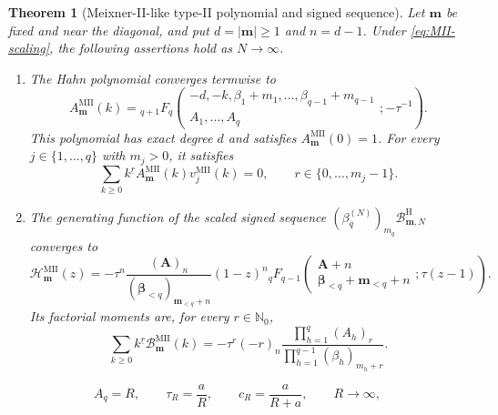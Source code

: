 \documentclass[10pt,a4paper]{amsart}
\newtheorem{theorem}{Theorem}
\newcommand{\A}{\boldsymbol A}
\newcommand{\Nzero}{\mathbb N_0}
\newcommand{\abs}[1]{\lvert#1\rvert}
\newcommand{\bbeta}{\boldsymbol\beta}
\newcommand{\fall}[2]{#1^{\underline{#2}}}
\newcommand{\mm}{\boldsymbol m}
\newcommand{\pFq}[5]{{}_{#1}F_{#2}\!\left(\begin{matrix}#3\\#4\end{matrix};#5\right)}
\begin{document}
\begin{theorem}[Meixner-II-like type-II polynomial and signed sequence]
\label{thm:MII-forms}
Let \(\mm\) be fixed and near the diagonal, and put
\(d=\abs\mm\ge1\) and \(n=d-1\). Under \eqref{eq:MII-scaling}, the
following assertions hold as \(N\to\infty\).
\begin{enumerate}[label=\textnormal{(\roman*)}]
\item The Hahn polynomial converges termwise to
\begin{equation}
 A_{\mm}^{\mathrm{MII}}(k)=
 \pFq{q+1}{q}
 {-d,-k,\beta_1+m_1,\ldots,\beta_{q-1}+m_{q-1}}
 {A_1,\ldots,A_q}{-\tau^{-1}}.
 \label{eq:MII-A}
\end{equation}
This polynomial has exact degree \(d\) and satisfies
\(A_{\mm}^{\mathrm{MII}}(0)=1\).
For every \(j\in\{1,\ldots,q\}\) with \(m_j>0\), it satisfies
\begin{equation}
 \sum_{k\ge0}\fall{k}{r}A_{\mm}^{\mathrm{MII}}(k)
 v_j^{\mathrm{MII}}(k)=0,
 \qquad r\in\{0,\ldots,m_j-1\}.
 \label{eq:MII-A-orthogonality}
\end{equation}

\item The generating function of the scaled signed sequence
\((\beta_q^{(N)})_{m_q}\mathcal B_{\mm,N}^{\mathrm H}\) converges to
\begin{equation}
 \mathcal H_{\mm}^{\mathrm{MII}}(z)
 =-\tau^n\frac{(\A)_n}{(\bbeta_{<q})_{\mm_{<q}+n}}(1-z)^n
 \pFq{q}{q-1}
 {\A+n}{\bbeta_{<q}+\mm_{<q}+n}{\tau(z-1)}.
 \label{eq:MII-B-pgf}
\end{equation}
Its factorial moments are, for every \(r\in\Nzero\),
\begin{equation}
 \sum_{k\ge0}\fall{k}{r}\mathcal B_{\mm}^{\mathrm{MII}}(k)
 =-\tau^r(-r)_n
 \frac{\prod_{h=1}^{q}(A_h)_r}
 {\prod_{h=1}^{q-1}(\beta_h)_{m_h+r}}.
 \label{eq:MII-B-moments}
\end{equation}
\end{enumerate}
\end{theorem}

\begin{equation}
 A_q=R,\qquad \tau_R=\frac aR,
 \qquad c_R=\frac{a}{R+a},\qquad R\to\infty,
 \label{eq:CII-scaling}
\end{equation}
\end{document}
